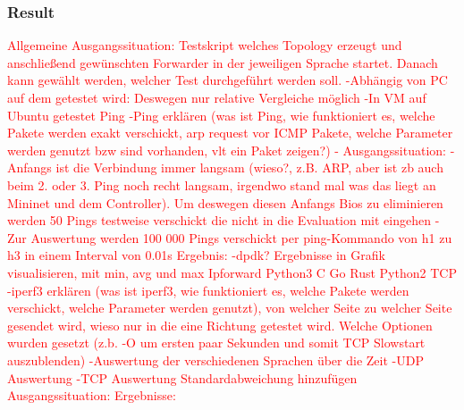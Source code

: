 \subsubsection{Result}




\textcolor{red}{Allgemeine Ausgangssituation: 
Testskript welches Topology erzeugt und anschließend gewünschten Forwarder in der jeweiligen Sprache startet. Danach kann gewählt werden, welcher Test durchgeführt werden soll. 
-Abhängig von PC auf dem getestet wird: Deswegen nur relative Vergleiche möglich 
-In VM auf Ubuntu getestet
Ping
-Ping erklären (was ist Ping, wie funktioniert es, welche Pakete werden exakt verschickt, arp request vor ICMP Pakete, welche Parameter werden genutzt bzw sind vorhanden, vlt ein Paket zeigen?)
-
Ausgangssituation:
	- Anfangs ist die Verbindung immer langsam (wieso?, z.B. ARP, aber ist zb auch beim 2. oder 3. Ping noch recht langsam, irgendwo stand mal was das liegt an Mininet und dem Controller). Um deswegen diesen Anfangs Bios zu eliminieren werden 50 Pings testweise verschickt die nicht in die Evaluation mit eingehen
	- Zur Auswertung werden 100 000 Pings verschickt per ping-Kommando von h1 zu h3 in einem Interval von 0.01s
Ergebnis:
-dpdk?
Ergebnisse in Grafik visualisieren, mit min, avg und max
Ipforward
Python3
C	
Go	
Rust	
Python2	
TCP
-iperf3 erklären (was ist iperf3, wie funktioniert es, welche Pakete werden verschickt, welche Parameter werden genutzt), von welcher Seite zu welcher Seite gesendet wird, wieso nur in die eine Richtung getestet wird. Welche Optionen wurden gesetzt (z.b. -O um ersten paar Sekunden und somit TCP Slowstart auszublenden)
-Auswertung der verschiedenen Sprachen über die Zeit
-UDP Auswertung
-TCP Auswertung Standardabweichung hinzufügen
Ausgangssituation:
Ergebnisse:}

